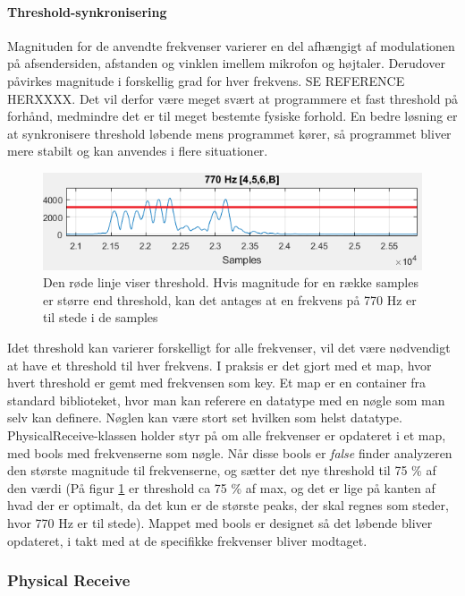 \paragraph{Threshold-synkronisering}

Magnituden for de anvendte frekvenser varierer en del afhængigt af modulationen på afsendersiden, afstanden og vinklen imellem mikrofon og højtaler. Derudover påvirkes magnitude i forskellig grad for hver frekvens. SE REFERENCE HERXXXX. Det vil derfor være meget svært at programmere et fast threshold på forhånd, medmindre det er til meget bestemte fysiske forhold. En bedre løsning er at synkronisere threshold løbende mens programmet kører, så programmet bliver mere stabilt og kan anvendes i flere situationer.

\begin{figure}[h]
\centering
\includegraphics[scale=0.7]{Billeder/Threshold.PNG}
\caption{Den røde linje viser threshold. Hvis magnitude for en række samples er større end threshold, kan det antages at en frekvens på 770 Hz er til stede i de samples}
\label{fig:threshold}
\end{figure}

Idet threshold kan varierer forskelligt for alle frekvenser, vil det være nødvendigt at have et threshold til hver frekvens. I praksis er det gjort med et map, hvor hvert threshold er gemt med frekvensen som key. Et map er en container fra standard biblioteket, hvor man kan referere en datatype med en nøgle som man selv kan definere. Nøglen kan være stort set hvilken som helst datatype. PhysicalReceive-klassen holder styr på om alle frekvenser er opdateret i et map, med bools med frekvenserne som nøgle. Når disse bools er \textit{false} finder analyzeren den største magnitude til frekvenserne, og sætter det nye threshold til 75 \% af den værdi (På figur \ref{fig:threshold} er threshold ca 75 \% af max, og det er lige på kanten af hvad der er optimalt, da det kun er de største peaks, der skal regnes som steder, hvor 770 Hz er til stede). Mappet med bools er designet så det løbende bliver opdateret, i takt med at de specifikke frekvenser bliver modtaget. 

\subsubsection{Physical Receive}

